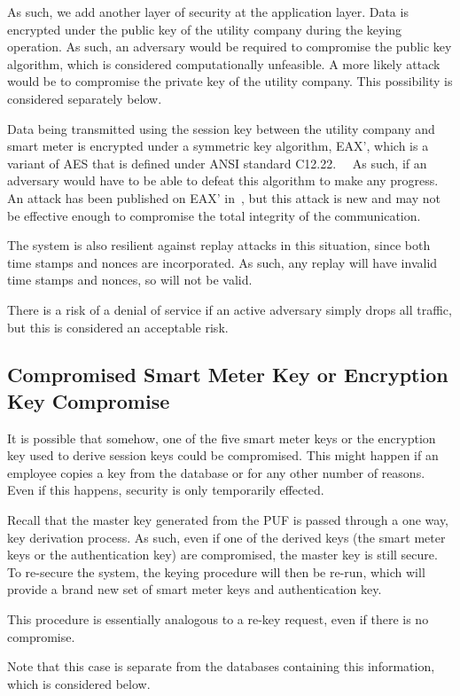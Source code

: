 As such, we add another layer of security at the application layer. Data is encrypted under the public key of the utility
company during the keying operation. As such, an adversary would be required to compromise the public key
algorithm, which is considered computationally unfeasible. A more likely attack would be to compromise the private key
of the utility company. This possibility is considered separately below.

Data being transmitted using the session key between the utility company and smart meter is encrypted under a
symmetric key algorithm, EAX', which is a variant of AES that is defined under ANSI standard 
C12.22.~\cite{ansi1222}~\cite{eax} As such, if an adversary would have to be able to defeat this algorithm to make
any progress. An attack has been published on EAX' in~\cite{eaxflaw}, but this attack is new and may not be effective
enough to compromise the total integrity of the communication.

The system is also resilient against replay attacks in this situation, since both time stamps and nonces are incorporated.
As such, any replay will have invalid time stamps and nonces, so will not be valid.

There is a risk of a denial of service if an active adversary simply drops all traffic, but this is considered an acceptable
risk.

\subsection{Compromised Smart Meter Key or Encryption Key Compromise}
It is possible that somehow, one of the five smart meter keys or the encryption key used to derive session keys
could be compromised. This might happen if an employee copies a key from the database or for any other number
of reasons. Even if this happens, security is only temporarily effected.

Recall that the master key generated from the PUF is passed through a one way, key derivation process. As such,
even if one of the derived keys (the smart meter keys or the authentication key) are compromised, the master key
is still secure. To re-secure the system, the keying procedure will then be re-run, which will provide a brand new set
of smart meter keys and authentication key.

This procedure is essentially analogous to a re-key request, even if there is no compromise.

Note that this case is separate from the databases containing this information, which is considered below.

